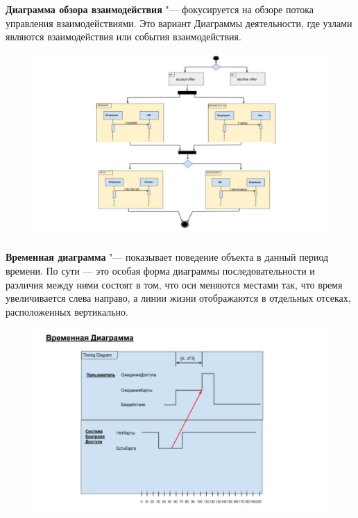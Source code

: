 \documentclass[bachelor, och, pract]{SCWorks}
\theoremstyle{remark}
\begin{document}
    \newpage
    \textbf{Диаграмма обзора взаимодействия} "--- фокусируется на обзоре потока управления взаимодействиями. Это вариант Диаграммы деятельности, где узлами являются взаимодействия или события взаимодействия.
    
    \begin{figure}[H]
        \begin{center}
            \includegraphics[scale=0.6]{res/interaction-overview-diagram.png}
        \end{center}
    \end{figure}

    \newpage
    \textbf{Временная диаграмма} "--- показывает поведение объекта в данный период времени. По сути — это особая форма диаграммы последовательности и различия между ними состоят в том, что оси меняются местами так, что время увеличивается слева направо, а линии жизни отображаются в отдельных отсеках, расположенных вертикально.

    \begin{figure}[H]
        \begin{center}
            \includegraphics[scale=0.5]{res/time-diagram.png}
        \end{center}
    \end{figure}
\end{document}
